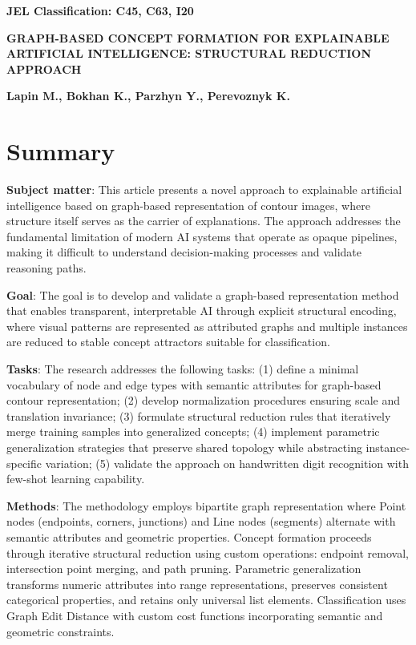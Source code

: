 \documentclass[a4paper,10pt]{article}
\begin{document}
\noindent\textbf{JEL Classification: C45, C63, I20}

\vspace{0.5cm}

\begin{center}
\textbf{\large GRAPH-BASED CONCEPT FORMATION FOR EXPLAINABLE ARTIFICIAL INTELLIGENCE: STRUCTURAL REDUCTION APPROACH}
\end{center}

\vspace{0.5cm}

\begin{center}
\textbf{Lapin M., Bokhan K., Parzhyn Y., Perevoznyk K.}
\end{center}

\vspace{0.5cm}

\section*{Summary}

\textbf{Subject matter}: This article presents a novel approach to explainable artificial intelligence based on graph-based representation of contour images, where structure itself serves as the carrier of explanations. The approach addresses the fundamental limitation of modern AI systems that operate as opaque pipelines, making it difficult to understand decision-making processes and validate reasoning paths.

\textbf{Goal}: The goal is to develop and validate a graph-based representation method that enables transparent, interpretable AI through explicit structural encoding, where visual patterns are represented as attributed graphs and multiple instances are reduced to stable concept attractors suitable for classification.

\textbf{Tasks}: The research addresses the following tasks: (1) define a minimal vocabulary of node and edge types with semantic attributes for graph-based contour representation; (2) develop normalization procedures ensuring scale and translation invariance; (3) formulate structural reduction rules that iteratively merge training samples into generalized concepts; (4) implement parametric generalization strategies that preserve shared topology while abstracting instance-specific variation; (5) validate the approach on handwritten digit recognition with few-shot learning capability.

\textbf{Methods}: The methodology employs bipartite graph representation where Point nodes (endpoints, corners, junctions) and Line nodes (segments) alternate with semantic attributes and geometric properties. Concept formation proceeds through iterative structural reduction using custom operations: endpoint removal, intersection point merging, and path pruning. Parametric generalization transforms numeric attributes into range representations, preserves consistent categorical properties, and retains only universal list elements. Classification uses Graph Edit Distance with custom cost functions incorporating semantic and geometric constraints.
\end{document}
